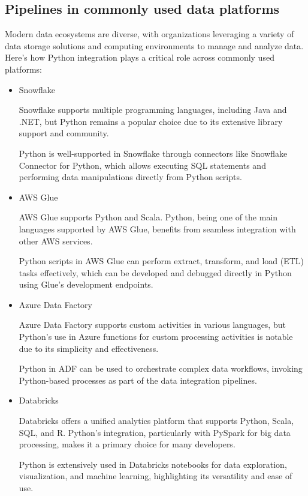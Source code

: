 \subsection{Pipelines in commonly used data platforms}

Modern data ecosystems are diverse, with organizations leveraging a variety of data storage solutions and computing environments to manage and analyze data. Here’s how Python integration plays a critical role across commonly used platforms:

\begin{itemize}

\item  Snowflake

Snowflake\cite{snowflake} supports multiple programming languages, including Java and .NET, but Python remains a popular choice due to its extensive library support and community.

Python is well-supported in Snowflake through connectors like Snowflake Connector for Python, which allows executing SQL statements and performing data manipulations directly from Python scripts.

\item AWS Glue

AWS Glue\cite{aws_glue} supports Python and Scala. Python, being one of the main languages supported by AWS Glue, benefits from seamless integration with other AWS services.

Python scripts in AWS Glue can perform extract, transform, and load (ETL) tasks effectively, which can be developed and debugged directly in Python using Glue’s development endpoints.

\item Azure Data Factory

Azure Data Factory\cite{azure_data_factory} supports custom activities in various languages, but Python’s use in Azure functions for custom processing activities is notable due to its simplicity and effectiveness.

Python in ADF can be used to orchestrate complex data workflows, invoking Python-based processes as part of the data integration pipelines.

\item Databricks

Databricks\cite{databricks} offers a unified analytics platform that supports Python, Scala, SQL, and R. Python’s integration, particularly with PySpark for big data processing, makes it a primary choice for many developers.

Python is extensively used in Databricks notebooks for data exploration, visualization, and machine learning, highlighting its versatility and ease of use.

\end{itemize}

